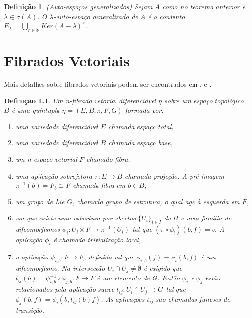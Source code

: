 \documentclass[12pt]{book}
\newtheorem{definicao}[teorema]{Definição}
\begin{document}
	\begin{definicao}\label{definicao_autoespaco_generalizado}
		(Auto-espaços generalizados) Sejam $A$ como no teorema anterior e $\lambda \in \sigma(A)$. O $\lambda$-auto-espaço generalizado de $A$ é o conjunto $E_{\lambda} = \bigcup_{r \in \mathbb{N}} Ker(A - \lambda)^{r}$.
	\end{definicao}
	
	\chapter{Fibrados Vetoriais}\label{apendice_fibrados}
	
	Mais detalhes sobre fibrados vetoriais podem ser encontrados em \cite{husemoller_fibrados}, \cite{nakahara} e \cite{steenrod_fibre_bundles}.
	
	\begin{definicao}
		Um n-fibrado vetorial diferenciável $\eta$ sobre um espaço topológico $B$ é uma quíntupla $\eta = (E, B, \pi, F, G)$ formada por:
		
		\begin{enumerate}
			\item uma variedade diferenciável $E$ chamada espaço total,
			
			\item uma variedade diferenciável $B$ chamada espaço base,
			
			\item um n-espaço vetorial $F$ chamado fibra.
			
			\item uma aplicação sobrejetora $\pi: E\to B$ chamada projeção. A pré-imagem $\pi^{-1}(b) = F_{b} \cong F$ chamada fibra em $b\in B$,
			
			\item um grupo de Lie $G$, chamado grupo de estrutura, o qual age à esquerda em $F$,
			
			\item em que existe uma cobertura por abertos $\{U_{i}\}_{i\in I}$ de $B$ e uma família de difeomorfismos $\phi_{i}: U_{i}\times F\to \pi^{-1}(U_{i})$ tal que $(\pi\circ \phi_{i})(b,f) = b$. A aplicação $\phi_{i}$ é chamada trivialização local,
			
			\item a aplicação $\phi_{i,b}: F\to F_{b}$ definida tal que $\phi_{i,b}(f) = \phi_{i}(b,f)$ é um difeomorfismo. Na intersecção $U_{i}\cap U_{j}\neq \emptyset$ é exigido que $t_{ij}(b)=\phi_{i,b}^{-1}\circ \phi_{j,b}:F\to F$ é um elemento de $G$. Então $\phi_{i}$ e $\phi_{j}$ estão relacionados pela aplicação suave $t_{ij}: U_{i}\cap U_{j}\to G$ tal que $\phi_{j}(b, f) = \phi_{i}(b, t_{ij}(b)f)$. As aplicações $t_{ij}$ são chamadas funções de transição.
		\end{enumerate}
		
	\end{definicao}
	
\end{document}
